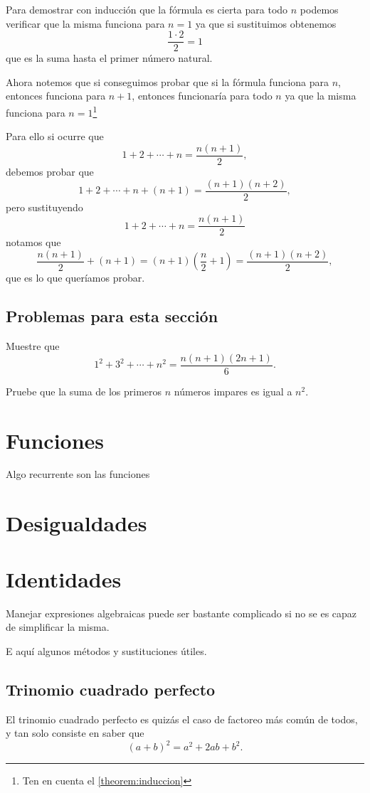 Para demostrar con inducción que la fórmula
es cierta para todo $n$
podemos verificar que la misma funciona
para $n = 1$ ya que si sustituimos obtenemos
\[\frac{1 \cdot 2}{2} = 1\]
que es la suma hasta el primer número natural.

Ahora notemos que si conseguimos probar que
si la fórmula funciona para $n$, entonces
funciona para $n + 1$, entonces funcionaría
para todo $n$ ya que la misma funciona para
$n = 1$\footnote{Ten en cuenta el \autoref{theorem:induccion}}

Para ello si ocurre que
\[1 + 2 + \cdots + n = \frac{n(n + 1)}2,\]
debemos probar que
\[1 + 2 + \cdots + n + (n + 1) = \frac{(n + 1)(n + 2)}2,\]
pero sustituyendo
\[1 + 2 + \cdots + n = \frac{n(n + 1)}2\]
notamos que
\[\frac{n(n + 1)}2 + (n + 1) = (n + 1)\left(\frac n2 + 1\right) = \frac{(n + 1)(n + 2)}2,\]
que es lo que queríamos probar.

\subsection*{Problemas para esta sección}
\begin{problem}
Muestre que
\[1^2 + 3^2 + \cdots + n^2 = \frac{n(n + 1)(2n + 1)}6.\]
\end{problem}

\begin{problem}
Pruebe que la suma de los primeros
$n$ números impares es igual a $n^2$.
\end{problem}

\section{Funciones}
Algo recurrente son las funciones

\section{Desigualdades}

\section{Identidades}
Manejar expresiones algebraicas puede ser
bastante complicado si no se es capaz
de simplificar la misma.

E aquí algunos métodos y sustituciones
útiles.

\subsection{Trinomio cuadrado perfecto}
El trinomio cuadrado perfecto es quizás
el caso de factoreo más común de todos,
y tan solo consiste en saber que
\[(a + b)^2 = a^2 + 2ab + b^2.\]

